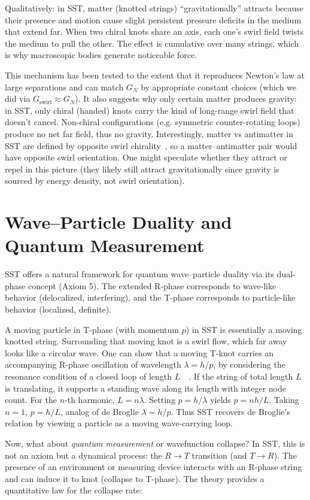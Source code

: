 \documentclass[aps,onecolumn,10pt,nofootinbib]{revtex4}
\begin{document}
	Qualitatively: in SST, matter (knotted strings) “gravitationally” attracts because their presence and motion cause slight persistent pressure deficits in the medium that extend far. When two chiral knots share an axis, each one’s swirl field twists the medium to pull the other. The effect is cumulative over many strings, which is why macroscopic bodies generate noticeable force.

	This mechanism has been tested to the extent that it reproduces Newton’s law at large separations and can match $G_N$ by appropriate constant choices (which we did via $G_{\text{swirl}}\approx G_N$). It also suggests why only certain matter produces gravity: in SST, only chiral (handed) knots carry the kind of long-range swirl field that doesn’t cancel. Non-chiral configurations (e.g. symmetric counter-rotating loops) produce no net far field, thus no gravity. Interestingly, matter vs antimatter in SST are defined by opposite swirl chirality~\cite{index97}, so a matter–antimatter pair would have opposite swirl orientation. One might speculate whether they attract or repel in this picture (they likely still attract gravitationally since gravity is sourced by energy density, not swirl orientation).

	\section{Wave–Particle Duality and Quantum Measurement}
	SST offers a natural framework for quantum wave–particle duality via its dual-phase concept (Axiom 5). The extended R-phase corresponds to wave-like behavior (delocalized, interfering), and the T-phase corresponds to particle-like behavior (localized, definite).

	A moving particle in T-phase (with momentum $p$) in SST is essentially a moving knotted string. Surrounding that moving knot is a swirl flow, which far away looks like a circular wave. One can show that a moving T-knot carries an accompanying R-phase oscillation of wavelength $\lambda = h/p$, by considering the resonance condition of a closed loop of length $L$~\cite{index98}~\cite{index99}. If the string of total length $L$ is translating, it supports a standing wave along its length with integer node count. For the $n$-th harmonic, $L = n \lambda$. Setting $p = h/\lambda$ yields $p = n h/L$. Taking $n=1$, $p = h/L$, analog of de Broglie $\lambda = h/p$. Thus SST recovers de Broglie’s relation by viewing a particle as a moving wave-carrying loop.

	Now, what about \emph{quantum measurement} or wavefunction collapse? In SST, this is not an axiom but a dynamical process: the $R\to T$ transition (and $T\to R$). The presence of an environment or measuring device interacts with an R-phase string and can induce it to knot (collapse to T-phase). The theory provides a quantitative law for the collapse rate:
\end{document}
